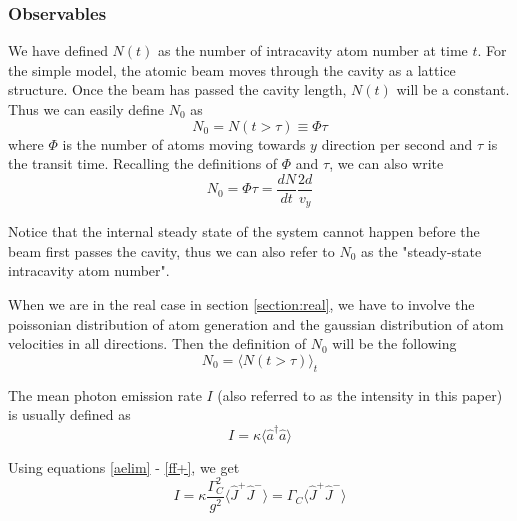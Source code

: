 \documentclass{article}
\newcommand{\gc}{\Gamma_C}
\begin{document}
\subsubsection{Observables}
\label{section:obsevables}
We have defined $N(t)$ as the number of intracavity atom number at time $t$. For the simple model, the atomic beam moves through the cavity as a lattice structure. Once the beam has passed the cavity length, $N(t)$ will be a constant. Thus we can easily define $N_0$ as 
\begin{equation}
    N_0 = N(t>\tau)\equiv \Phi \tau 
\end{equation}
where $\Phi$ is the number of atoms moving towards $y$ direction per second and $\tau$ is the transit time. Recalling the definitions of $\Phi$ and $\tau$, we can also write 
\begin{equation}
\label{n0simple}
    N_0 =\Phi\tau=\frac{dN}{dt}\frac{2d}{v_y} 
\end{equation}

Notice that the internal steady state of the system cannot happen before the beam first passes the cavity, thus we can also refer to $N_0$ as the "steady-state intracavity atom number".

When we are in the real case in section \ref{section:real}, we have to involve the poissonian distribution of atom generation and the gaussian distribution of atom velocities in all directions. Then the definition of $N_0$ will be the following
\begin{equation}
    N_0=\langle N(t>\tau) \rangle_t
\end{equation}


The mean photon emission rate $I$ (also referred to as the intensity in this paper) is usually defined as
\begin{equation}
    I = \kappa\langle \hat{a}^\dagger\hat{a}\rangle
\end{equation}

Using equations \ref{aelim} - \ref{ff+}, we get
\begin{equation}
    I = \kappa\frac{\gc^2}{g^2}\langle \hat{J}^+\hat{J}^-\rangle = \gc\langle \hat{J}^+\hat{J}^-\rangle
\end{equation}
\end{document}
